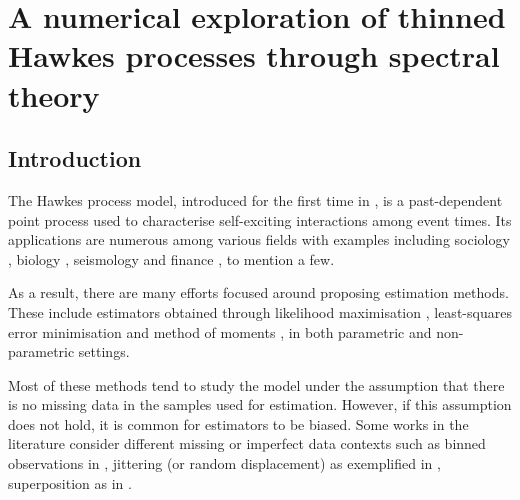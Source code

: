 
\chapter[][]{A numerical exploration of thinned Hawkes processes through spectral theory}\label{chapter:spectral_thinning}

\section{Introduction}

The Hawkes process model, introduced for the first time in \textcite{Hawkes1971}, is a past-dependent point process used to characterise self-exciting interactions among event times. 
Its applications are numerous among various fields with examples including sociology \parencite{Linderman2014},
biology \parencite{Gupta2018, Lambert2018, Rizoiu2018},
seismology \parencite{Ogata1988, Ogata1998}
and finance \parencite{Bacry2013, Bacry2015, Hawkes2018}, to mention a few.

As a result, there are many efforts focused around proposing estimation methods. These include estimators obtained through likelihood maximisation \parencite{Ogata1978, Ozaki1979}, 
least-squares error minimisation \parencite{Reynaud2014,Bacry2020} and method of moments \parencite{DaFonseca2013}, 
in both parametric and non-parametric settings.

Most of these methods tend to study the model under the assumption that there is no missing data in the samples used for estimation. 
However, if this assumption does not hold, it is common for estimators to be biased.
Some works in the literature consider different missing or imperfect data contexts such as binned observations in \textcite{Cheysson2022}, jittering (or random displacement) as exemplified in \textcite{Antoniadis2006,Bonnet2022}, superposition as in \textcite{Bonnet2024}. 

